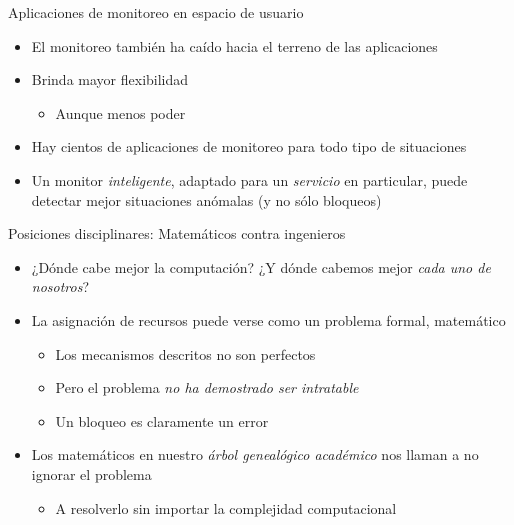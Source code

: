 \documentclass[presentation]{beamer}
\begin{document}
\begin{frame}[label={sec:org519841e}]{Aplicaciones de monitoreo en espacio de usuario}
\begin{itemize}
\item El monitoreo también ha caído hacia el terreno de las aplicaciones
\item Brinda mayor flexibilidad
\begin{itemize}
\item Aunque menos poder
\end{itemize}
\item Hay cientos de aplicaciones de monitoreo para todo tipo de situaciones
\item Un monitor \emph{inteligente}, adaptado para un \emph{servicio} en particular,
puede detectar mejor situaciones anómalas (y no sólo bloqueos)
\end{itemize}
\end{frame}

\begin{frame}[label={sec:org621042a}]{Posiciones disciplinares: Matemáticos contra ingenieros}
\begin{itemize}
\item ¿Dónde cabe mejor la computación? ¿Y dónde cabemos mejor \emph{cada uno
de nosotros}?
\item La asignación de recursos puede verse como un problema formal,
matemático
\begin{itemize}
\item Los mecanismos descritos no son perfectos
\item Pero el problema \emph{no ha demostrado ser intratable}
\item Un bloqueo es claramente un error
\end{itemize}
\item Los matemáticos en nuestro \emph{árbol genealógico académico} nos llaman
a no ignorar el problema
\begin{itemize}
\item A resolverlo sin importar la complejidad computacional
\end{itemize}
\end{itemize}
\end{frame}
\end{document}
